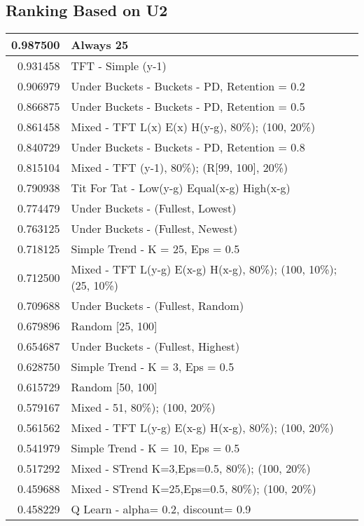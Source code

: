 \begin{table}[!hbtp]
\subsection{Ranking Based on U2}
\begin{footnotesize}
\begin{tabular}{|r|l|}\hline  \label{U3results}
0.987500 & Always 25\\ \hline
0.931458 & TFT - Simple (y-1)\\ \hline
0.906979 & Under Buckets - Buckets - PD, Retention = 0.2\\ \hline
0.866875 & Under Buckets - Buckets - PD, Retention = 0.5\\ \hline
0.861458 & Mixed - {TFT L(x) E(x) H(y-g), 80\%); (100, 20\%)}\\ \hline
0.840729 & Under Buckets - Buckets - PD, Retention = 0.8\\ \hline
0.815104 & Mixed - {TFT (y-1), 80\%); (R[99, 100], 20\%)}\\ \hline
0.790938 & Tit For Tat - Low(y-g) Equal(x-g) High(x-g)\\ \hline
0.774479 & Under Buckets - (Fullest, Lowest)\\ \hline
0.763125 & Under Buckets - (Fullest, Newest)\\ \hline
0.718125 & Simple Trend - K = 25, Eps = 0.5\\ \hline
0.712500 & Mixed - {TFT L(y-g) E(x-g) H(x-g), 80\%); (100, 10\%); (25, 10\%)}\\ \hline
0.709688 & Under Buckets - (Fullest, Random)\\ \hline
0.679896 & Random [25, 100]\\ \hline
0.654687 & Under Buckets - (Fullest, Highest)\\ \hline
0.628750 & Simple Trend - K = 3, Eps = 0.5\\ \hline
0.615729 & Random [50, 100]\\ \hline
0.579167 & Mixed - {51, 80\%); (100, 20\%)}\\ \hline
0.561562 & Mixed - {TFT L(y-g) E(x-g) H(x-g), 80\%); (100, 20\%)}\\ \hline
0.541979 & Simple Trend - K = 10, Eps = 0.5\\ \hline
0.517292 & Mixed - {STrend K=3,Eps=0.5, 80\%); (100, 20\%)}\\ \hline
0.459688 & Mixed - {STrend K=25,Eps=0.5, 80\%); (100, 20\%)}\\ \hline
0.458229 & Q Learn - alpha= 0.2, discount= 0.9\\ \hline

\end{tabular}
\end{footnotesize}
\end{table}
